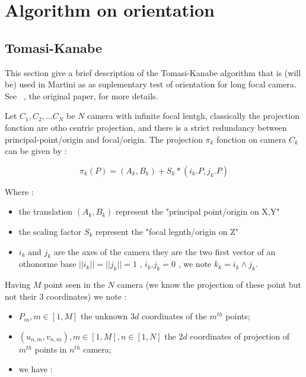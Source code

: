 \chapter{Algorithm on orientation}


\section{Tomasi-Kanabe}

This section give a brief description of the Tomasi-Kanabe algorithm
that is (will be) used in Martini as as suplementary test of
orientation for long focal camera. See~\cite{TomKan} , the original paper,
for more details.


Let $C_1,C_2, \dots C_N$ be $N$ camera with infinite focal lentgh, classically
the projection fonction are otho centric projection, and there is a strict redundancy
between principal-point/origin and  focal/origin. The projection $\pi_k$ fonction on camera $C_k$
can be given by :

\begin{equation}
   \pi_k(P) =  (A_k,B_k)   + S_k * (i_k . P , j_k.P) \label{TomKanProj}
\end{equation}

Where :

\begin{itemize}
   \item  the translation $(A_k,B_k)$ represent the "principal point/origin on X,Y"
   \item  the scaling factor $S_k$ represent the "focal legnth/origin on Z"
   \item  $i_k$ and $j_k$ are the axes of the camera they are the two first vector
          of an othonorme base $||i_k|| = ||j_k|| = 1$ , $i_k . j_k = 0 $ ,
          we note $k_k = i_k \wedge j_k$.
\end{itemize}


Having $M$ point seen in the $N$ camera  (we know the projection of these point but not their $3$ coordinates) we note :

\begin{itemize}
    \item $P_m , m \in[1,M]$  the unknown $3d$ coordinates of the $m^{th}$ points;
    \item $(u_{n,m},v_{n,m}), m \in[1,M], n \in [1,N] $   the $2d$ coordinates of projection
          of $m^{th}$ points in $n^{th}$ camera;
    \item we have :
\end{itemize}

